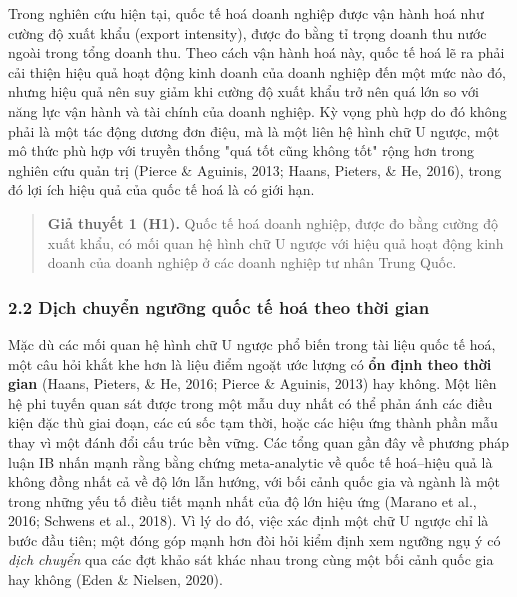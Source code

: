 \documentclass[12pt,a4paper]{article}
\begin{document}
Trong nghiên cứu hiện tại, quốc tế hoá doanh nghiệp được vận hành hoá
như cường độ xuất khẩu (export intensity), được đo bằng tỉ trọng doanh
thu nước ngoài trong tổng doanh thu. Theo cách vận hành hoá này, quốc tế
hoá lẽ ra phải cải thiện hiệu quả hoạt động kinh doanh của doanh nghiệp
đến một mức nào đó, nhưng hiệu quả nên suy giảm khi cường độ xuất khẩu
trở nên quá lớn so với năng lực vận hành và tài chính của doanh nghiệp.
Kỳ vọng phù hợp do đó không phải là một tác động dương đơn điệu, mà là
một liên hệ hình chữ U ngược, một mô thức phù hợp với truyền thống "quá
tốt cũng không tốt" rộng hơn trong nghiên cứu quản trị (Pierce \&
Aguinis, 2013; Haans, Pieters, \& He, 2016), trong đó lợi ích hiệu quả
của quốc tế hoá là có giới hạn.

\begin{quote}
\textbf{Giả thuyết 1 (H1).} Quốc tế hoá doanh nghiệp, được đo bằng cường
độ xuất khẩu, có mối quan hệ hình chữ U ngược với hiệu quả hoạt động
kinh doanh của doanh nghiệp ở các doanh nghiệp tư nhân Trung Quốc.
\end{quote}

\hypertarget{22-dux1ecbch-chuyux1ec3n-ngux1b0ux1ee1ng-quux1ed1c-tux1ebf-houxe1-theo-thux1eddi-gian}{%
\subsubsection{2.2 Dịch chuyển ngưỡng quốc tế hoá theo thời
gian}\label{22-dux1ecbch-chuyux1ec3n-ngux1b0ux1ee1ng-quux1ed1c-tux1ebf-houxe1-theo-thux1eddi-gian}}

Mặc dù các mối quan hệ hình chữ U ngược phổ biến trong tài liệu quốc tế
hoá, một câu hỏi khắt khe hơn là liệu điểm ngoặt ước lượng có \textbf{ổn
định theo thời gian} (Haans, Pieters, \& He, 2016; Pierce \& Aguinis,
2013) hay không. Một liên hệ phi tuyến quan sát được trong một mẫu duy
nhất có thể phản ánh các điều kiện đặc thù giai đoạn, các cú sốc tạm
thời, hoặc các hiệu ứng thành phần mẫu thay vì một đánh đổi cấu trúc bền
vững. Các tổng quan gần đây về phương pháp luận IB nhấn mạnh rằng bằng
chứng meta-analytic về quốc tế hoá--hiệu quả là không đồng nhất cả về độ
lớn lẫn hướng, với bối cảnh quốc gia và ngành là một trong những yếu tố
điều tiết mạnh nhất của độ lớn hiệu ứng (Marano et al., 2016; Schwens et
al., 2018). Vì lý do đó, việc xác định một chữ U ngược chỉ là bước đầu
tiên; một đóng góp mạnh hơn đòi hỏi kiểm định xem ngưỡng ngụ ý có
\emph{dịch chuyển} qua các đợt khảo sát khác nhau trong cùng một bối
cảnh quốc gia hay không (Eden \& Nielsen, 2020).
\end{document}
